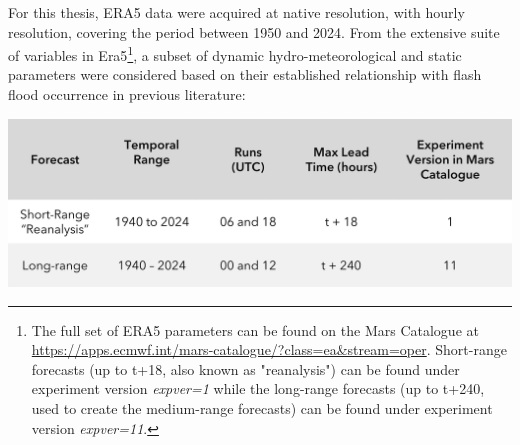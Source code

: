 For this thesis, ERA5 data were acquired at native resolution, with hourly resolution, covering the period between 1950 and 2024. From the extensive suite of variables in Era5\footnote {The full set of ERA5 parameters can be found on the Mars Catalogue at \url{https://apps.ecmwf.int/mars-catalogue/?class=ea&stream=oper}. Short-range forecasts (up to t+18, also known as "reanalysis") can be found under experiment version \textit{expver=1} while the long-range forecasts (up to t+240, used to create the medium-range forecasts) can be found under experiment version \textit{expver=11}.}, a subset of dynamic hydro-meteorological and static parameters were considered based on their established relationship with flash flood occurrence in previous literature: 

\begin{table}[htbp]
\centering
{}
\includegraphics[width=1\textwidth]{forecasts_types.png}
\label{table:forecasts_types}
\end{table}

